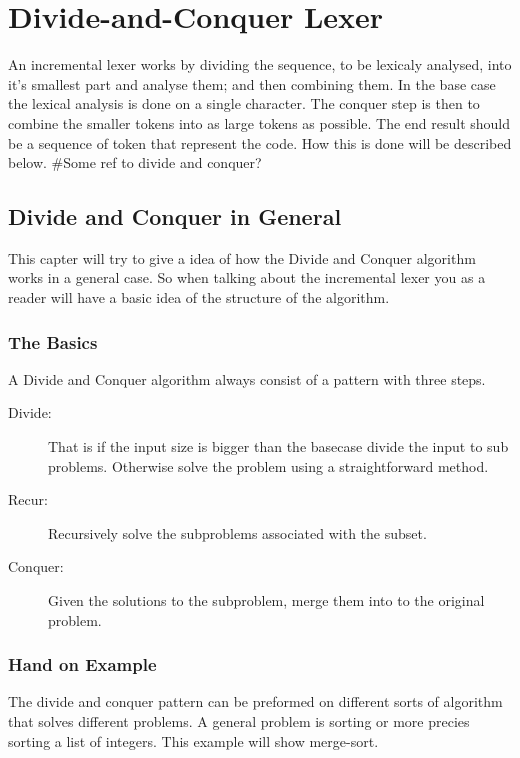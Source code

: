 \chapter{Divide-and-Conquer Lexer}
An incremental lexer works by dividing the sequence, to be lexicaly analysed,
into it's smallest part and analyse them; and then combining them. In the base
case the lexical analysis is done on a single character. The conquer step is
then to combine the smaller tokens into as large tokens as possible. The end
result should be a sequence of token that represent the code. How this is done
will be described below. \#Some ref to divide and conquer?

\section{Divide and Conquer in General}
This capter will try to give a idea of how the Divide and Conquer algorithm works in a general case. So when talking about the incremental lexer you as a reader will have a basic idea of the structure of the algorithm.
\subsection{The Basics}
A Divide and Conquer algorithm always consist of a pattern with three steps. \cite{Goodrich}
\begin{description}
\item[Divide:] That is if the input size is bigger than the basecase divide the input to sub problems. Otherwise solve the problem using a straightforward method.
\item[Recur:] Recursively solve the subproblems associated with the subset.
\item[Conquer:] Given the solutions to the subproblem, merge them into to the original problem.
\end{description}

\subsection{Hand on Example}
The divide and conquer pattern can be preformed on different sorts of algorithm that solves different problems. A general problem is sorting or more precies sorting a list of integers. This example will show merge-sort.

